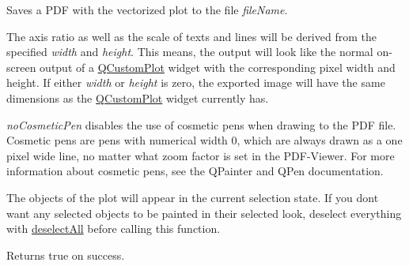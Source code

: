 Saves a P\+D\+F with the vectorized plot to the file {\itshape file\+Name}. 

The axis ratio as well as the scale of texts and lines will be derived from the specified {\itshape width} and {\itshape height}. This means, the output will look like the normal on-\/screen output of a \hyperlink{classQCustomPlot}{Q\+Custom\+Plot} widget with the corresponding pixel width and height. If either {\itshape width} or {\itshape height} is zero, the exported image will have the same dimensions as the \hyperlink{classQCustomPlot}{Q\+Custom\+Plot} widget currently has.

{\itshape no\+Cosmetic\+Pen} disables the use of cosmetic pens when drawing to the P\+D\+F file. Cosmetic pens are pens with numerical width 0, which are always drawn as a one pixel wide line, no matter what zoom factor is set in the P\+D\+F-\/\+Viewer. For more information about cosmetic pens, see the Q\+Painter and Q\+Pen documentation.

The objects of the plot will appear in the current selection state. If you don\textquotesingle{}t want any selected objects to be painted in their selected look, deselect everything with \hyperlink{classQCustomPlot_a9d4808ab925b003054085246c92a257c}{deselect\+All} before calling this function.

Returns true on success.

